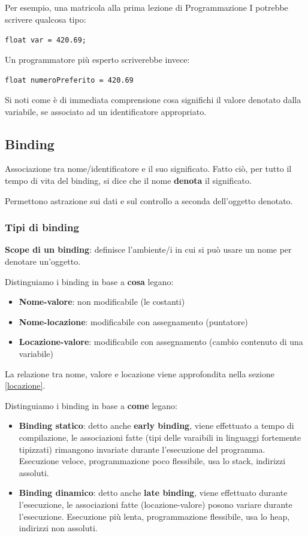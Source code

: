 \documentclass[12pt,a4paper]{article}
\begin{document}
Per esempio, una matricola alla prima lezione di Programmazione I potrebbe scrivere qualcosa tipo:
\begin{center}
\texttt{float var = 420.69;}
\end{center}

Un programmatore più esperto scriverebbe invece:
\begin{center}
\texttt{float numeroPreferito = 420.69}
\end{center}

Si noti come è di immediata comprensione cosa significhi il valore denotato dalla variabile, se associato ad un identificatore appropriato.
\subsection{Binding}
Associazione tra nome\slash identificatore e il suo significato. Fatto ciò, per tutto il tempo di vita del binding, si dice che il nome \textbf{denota} il significato.

Permettono astrazione sui dati e sul controllo a seconda dell'oggetto denotato.

\subsubsection{Tipi di binding}

\textbf{Scope di un binding}: definisce l'ambiente\slash i in cui si può usare un nome per denotare un'oggetto.

Distinguiamo i binding in base a \textbf{cosa} legano:
\begin{itemize}
\item \textbf{Nome-valore}: non modificabile (le costanti)
\item \textbf{Nome-locazione}: modificabile con assegnamento (puntatore)
\item \textbf{Locazione-valore}: modificabile con assegnamento (cambio contenuto di una variabile)
\end{itemize}
La relazione tra nome, valore e locazione viene approfondita nella sezione \ref{locazione}.

Distinguiamo i binding in base a \textbf{come} legano:
\begin{itemize}
\item \textbf{Binding statico}: detto anche \textbf{early binding}, viene effettuato a tempo di compilazione, le associazioni fatte (tipi delle varaibili in linguaggi fortemente tipizzati) rimangono invariate durante l'esecuzione del programma. Esecuzione veloce, programmazione poco flessibile, usa lo stack, indirizzi assoluti.
\item \textbf{Binding dinamico}: detto anche \textbf{late binding}, viene effettuato durante l'esecuzione, le associazioni fatte (locazione-valore) posono variare durante l'esecuzione. Esecuzione più lenta, programmazione flessibile, usa lo heap, indirizzi non assoluti.
\end{itemize}
\end{document}
